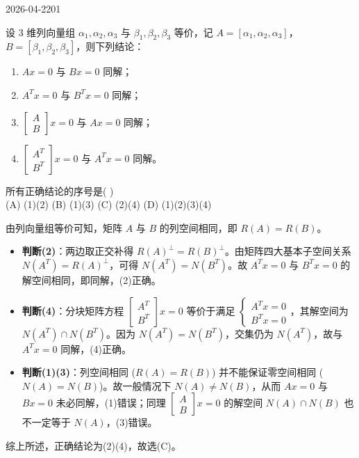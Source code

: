 \begin{mistake}{2026-04-22}{01}

\begin{problemcontent}
设 3 维列向量组 \(\alpha_1, \alpha_2, \alpha_3\) 与 \(\beta_1, \beta_2, \beta_3\) 等价，记 \(A=[\alpha_1, \alpha_2, \alpha_3]\)，\(B=[\beta_1, \beta_2, \beta_3]\)，则下列结论：
\begin{enumerate}
 \item[(1)] \(Ax=0\) 与 \(Bx=0\) 同解；
 \item[(2)] \(A^Tx=0\) 与 \(B^Tx=0\) 同解；
 \item[(3)] \(\begin{bmatrix} A \\ B \end{bmatrix} x = 0\) 与 \(Ax=0\) 同解；
 \item[(4)] \(\begin{bmatrix} A^T \\ B^T \end{bmatrix} x = 0\) 与 \(A^Tx=0\) 同解。
\end{enumerate}
所有正确结论的序号是( \quad ) \\
(A) (1)(2) \qquad (B) (1)(3) \qquad (C) (2)(4) \qquad (D) (1)(2)(3)(4)
\end{problemcontent}

\begin{solutioncontent}
由列向量组等价可知，矩阵 \(A\) 与 \(B\) 的列空间相同，即 \(R(A) = R(B)\)。

\begin{itemize}
 \item \textbf{判断(2)}：两边取正交补得 \(R(A)^\perp = R(B)^\perp\)。由矩阵四大基本子空间关系 \(N(A^T) = R(A)^\perp\)，可得 \(N(A^T) = N(B^T)\)。故 \(A^Tx=0\) 与 \(B^Tx=0\) 的解空间相同，即同解，(2)正确。
 \item \textbf{判断(4)}：分块矩阵方程 \(\begin{bmatrix} A^T \\ B^T \end{bmatrix} x = 0\) 等价于满足 \(\begin{cases} A^Tx=0 \\ B^Tx=0 \end{cases}\)，其解空间为 \(N(A^T) \cap N(B^T)\)。因为 \(N(A^T) = N(B^T)\)，交集仍为 \(N(A^T)\)，故与 \(A^Tx=0\) 同解，(4)正确。
 \item \textbf{判断(1)(3)}：列空间相同 (\(R(A)=R(B)\)) 并不能保证零空间相同 (\(N(A)=N(B)\))。故一般情况下 \(N(A) \neq N(B)\)，从而 \(Ax=0\) 与 \(Bx=0\) 未必同解，(1)错误；同理 \(\begin{bmatrix} A \\ B \end{bmatrix} x = 0\) 的解空间 \(N(A) \cap N(B)\) 也不一定等于 \(N(A)\)，(3)错误。
\end{itemize}
综上所述，正确结论为(2)(4)，故选(C)。
\end{solutioncontent}


\end{mistake}
